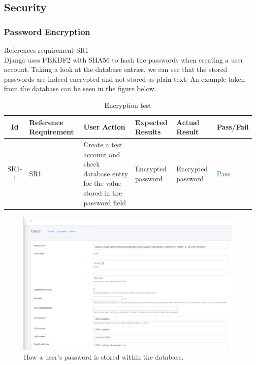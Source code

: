 \documentclass[12pt, titlepage]{article}
\begin{document}
\subsection{Security}
    \subsubsection{Password Encryption}
        References requirement SR1\\
        Django uses PBKDF2 with SHA56 to hash the passwords when creating a user account. Taking a look at the database entries, we can see that the stored passwords are indeed encrypted and not stored as plain text. An example taken from the database can be seen in the figure below.

    \begin{table}[H]
        \centering
        \begin{tabularx}{\textwidth}{|c|p{2.3cm}|p{2.4cm}|p{2.5cm}|p{2.2cm}|p{2cm}|}
            \hline
            Id & Reference Requirement & User Action & Expected Results & Actual Result & Pass/Fail\\ \hline
            SR1-1 & SR1 & Create a test account and check database entry for the value stored in the password field & Encrypted password & Encrypted password & \textcolor{green}{Pass} \\ \hline
        \end{tabularx}
        \caption{Encryption test}
    \end{table}
    
    \begin{figure}[H]
        \centering
        \includegraphics[width=1.1\textwidth]{VnVReport/result_images/password.png}
        \caption{How a user's password is stored within the database.}
        \label{fig:encryption}
    \end{figure}
\end{document}
